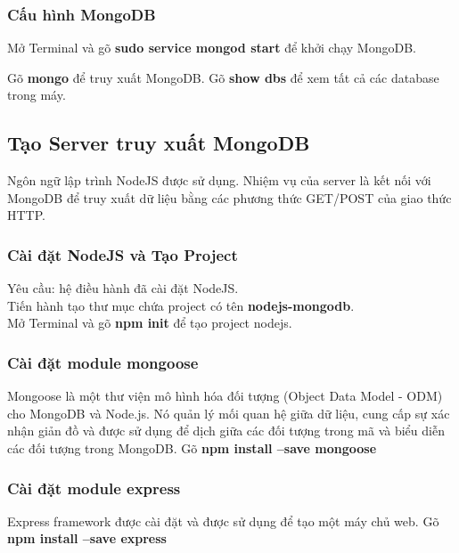 \subsubsection{Cấu hình MongoDB}
Mở Terminal và gõ \textbf{sudo service mongod start} để khởi chạy MongoDB.\\
\label{ref{fig4_2}}

Gõ \textbf{mongo} để truy xuất MongoDB.
\label{ref{fig4_3}}
Gõ \textbf{show dbs} để xem tất cả các database trong máy.
\label{ref{fig4_4}}

\subsection{Tạo Server truy xuất MongoDB}
Ngôn ngữ lập trình NodeJS được sử dụng. Nhiệm vụ của server là kết nối với MongoDB để truy xuất dữ liệu bằng các phương thức GET/POST của giao thức HTTP.

\subsubsection{Cài đặt NodeJS và Tạo Project}
Yêu cầu: hệ điều hành đã cài đặt NodeJS.\\
Tiến hành tạo thư mục chứa project có tên \textbf{nodejs-mongodb}.\\
Mở Terminal và gõ \textbf{npm init} để tạo project nodejs.\\
\label{ref{fig4_5}}

\subsubsection{Cài đặt module mongoose}
Mongoose là một thư viện mô hình hóa đối tượng (Object Data Model - ODM) cho MongoDB và Node.js. Nó quản lý mối quan hệ giữa dữ liệu, cung cấp sự xác nhận giản đồ và được sử dụng để dịch giữa các đối tượng trong mã và biểu diễn các đối tượng trong MongoDB.
\label{ref{fig4_6_1}}
Gõ \textbf{npm install --save mongoose}
\label{ref{fig4_6}}

\subsubsection{Cài đặt module express}
Express framework được cài đặt và được sử dụng để tạo một máy chủ web.
Gõ \textbf{npm install --save express}
\label{ref{fig4_7}}

